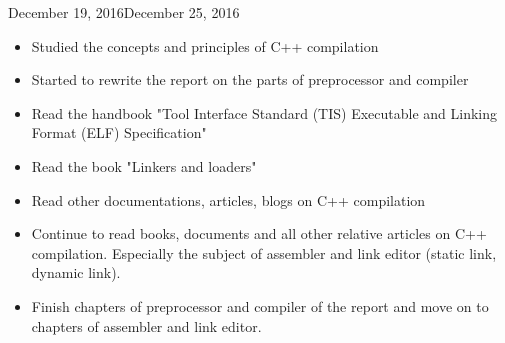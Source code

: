 \begin{fichesuivi}{December 19, 2016}{December 25, 2016}

   \begin{travaileffectue}
        \begin{itemize}
            \item Studied the concepts and principles of C++ compilation 
            \item Started to rewrite the report on the parts of preprocessor and compiler
        \end{itemize}
   \end{travaileffectue}

   \begin{travailnoneffectue}
        \begin{itemize}
             \item Read the handbook "Tool Interface Standard (TIS)
                    Executable and Linking Format (ELF)
                    Specification"
            \item Read the book "Linkers and loaders"
            \item Read other documentations, articles, blogs on C++ compilation
        \end{itemize}
   \end{travailnoneffectue}

 
   \begin{planification}
        \begin{itemize}
            \item Continue to read books, documents and all other relative articles on C++ compilation.
            Especially the subject of assembler and link editor (static link, dynamic link).
            \item Finish chapters of preprocessor and compiler of the report and move on to chapters of assembler and link editor.
        \end{itemize}
   \end{planification}
\end{fichesuivi}





